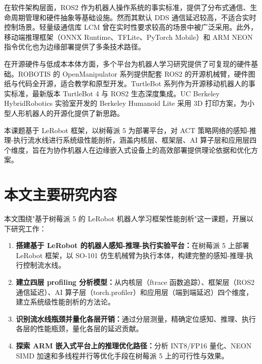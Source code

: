 在软件架构层面，ROS2 作为机器人操作系统的事实标准，提供了分布式通信、生命周期管理和硬件抽象等基础设施。然而其默认 DDS 通信延迟较高，不适合实时控制场景。轻量级通信库 LCM 曾在实时性要求较高的场景中被广泛采用。此外，移动端推理框架（ONNX Runtime、TFLite、PyTorch Mobile）和 ARM NEON 指令优化也为边缘部署提供了多条技术路径。

在开源硬件与低成本本体方面，多个平台为机器人学习研究提供了可复现的硬件基础。ROBOTIS 的 OpenManipulator 系列提供配套 ROS2 的开源机械臂，硬件图纸与代码全开源，适合教学和原型开发。TurtleBot 系列作为开源移动机器人的事实标准，最新版本 TurtleBot 4 与 ROS2 生态深度集成。UC Berkeley HybridRobotics 实验室开发的 Berkeley Humanoid Lite 采用 3D 打印方案，为小型人形机器人的开源化提供了新思路。

本课题基于 LeRobot 框架，以树莓派 5 为部署平台，对 ACT 策略网络的感知-推理-执行流水线进行系统级性能剖析，涵盖内核层、框架层、AI 算子层和应用层四个维度，旨在为协作机器人在边缘嵌入式设备上的高效部署提供理论依据和优化方案。


\section{本文主要研究内容}

本文围绕"基于树莓派 5 的 LeRobot 机器人学习框架性能剖析"这一课题，开展以下研究工作：

\begin{enumerate}
  \item \textbf{搭建基于 LeRobot 的机器人感知-推理-执行实验平台：}在树莓派 5 上部署 LeRobot 框架，以 SO-101 仿生机械臂为执行本体，构建完整的感知-推理-执行控制流水线。

  \item \textbf{建立四层 profiling 分析模型：}从内核层（ftrace 函数追踪）、框架层（ROS2 通信延迟）、AI 算子层（torch.profiler）和应用层（端到端延迟）四个维度，建立系统级性能剖析的方法论。

  \item \textbf{识别流水线瓶颈并量化各层开销：}通过分层测量，精确定位感知、推理、执行各层的性能瓶颈，量化各层的延迟贡献。

  \item \textbf{探索 ARM 嵌入式平台上的推理优化路径：}分析 INT8/FP16 量化、NEON SIMD 加速和多线程并行等优化手段在树莓派 5 上的可行性与效果。
\end{enumerate}


